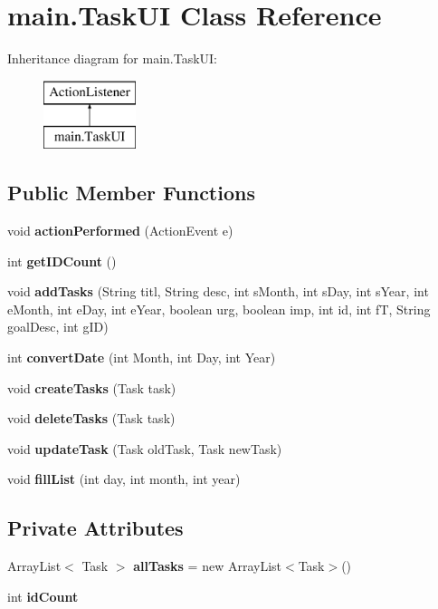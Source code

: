 \section{main.\+Task\+UI Class Reference}
\label{classmain_1_1_task_u_i}
Inheritance diagram for main.\+Task\+UI\+:\begin{figure}[H]
\begin{center}
\leavevmode
\includegraphics[height=2.000000cm]{classmain_1_1_task_u_i}
\end{center}
\end{figure}
\subsection*{Public Member Functions}
\begin{DoxyCompactItemize}
\item 
void \textbf{ action\+Performed} (Action\+Event e)
\item 
int \textbf{ get\+I\+D\+Count} ()
\item 
void \textbf{ add\+Tasks} (String titl, String desc, int s\+Month, int s\+Day, int s\+Year, int e\+Month, int e\+Day, int e\+Year, boolean urg, boolean imp, int id, int fT, String goal\+Desc, int g\+ID)
\item 
int \textbf{ convert\+Date} (int Month, int Day, int Year)
\item 
void \textbf{ create\+Tasks} (Task task)
\item 
void \textbf{ delete\+Tasks} (Task task)
\item 
void \textbf{ update\+Task} (Task old\+Task, Task new\+Task)
\item 
void \textbf{ fill\+List} (int day, int month, int year)
\end{DoxyCompactItemize}
\subsection*{Private Attributes}
\begin{DoxyCompactItemize}
\item 
Array\+List$<$ Task $>$ \textbf{ all\+Tasks} = new Array\+List$<$Task$>$()
\item 
int \textbf{ id\+Count}
\end{DoxyCompactItemize}


